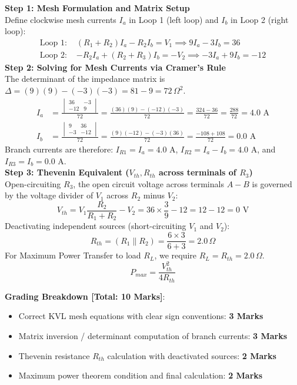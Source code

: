 \begin{solbox}
\textbf{Step 1: Mesh Formulation and Matrix Setup}\\Define clockwise mesh currents $I_a$ in Loop 1 (left loop) and $I_b$ in Loop 2 (right loop):\begin{align*}\text{Loop 1: } & (R_1 + R_2)I_a - R_2 I_b = V_1 \implies 9 I_a - 3 I_b = 36 \\\text{Loop 2: } & -R_2 I_a + (R_2 + R_3)I_b = -V_2 \implies -3 I_a + 9 I_b = -12\end{align*}\textbf{Step 2: Solving for Mesh Currents via Cramer's Rule}\\The determinant of the impedance matrix is $\Delta = (9)(9) - (-3)(-3) = 81 - 9 = 72\,\Omega^2$.\begin{align*}I_a &= \frac{\begin{vmatrix} 36 & -3 \\ -12 & 9 \end{vmatrix}}{72} = \frac{(36)(9) - (-12)(-3)}{72} = \frac{324 - 36}{72} = \frac{288}{72} = 4.0\text{ A} \\I_b &= \frac{\begin{vmatrix} 9 & 36 \\ -3 & -12 \end{vmatrix}}{72} = \frac{(9)(-12) - (-3)(36)}{72} = \frac{-108 + 108}{72} = 0.0\text{ A}\end{align*}Branch currents are therefore: $I_{R1} = I_a = 4.0\text{ A}$, $I_{R2} = I_a - I_b = 4.0\text{ A}$, and $I_{R3} = I_b = 0.0\text{ A}$.\\[2mm]\textbf{Step 3: Thevenin Equivalent ($V_{th}, R_{th}$ across terminals of $R_3$)}\\Open-circuiting $R_3$, the open circuit voltage across terminals $A-B$ is governed by the voltage divider of $V_1$ across $R_2$ minus $V_2$:\[ V_{th} = V_1 \frac{R_2}{R_1 + R_2} - V_2 = 36 \times \frac{3}{9} - 12 = 12 - 12 = 0\text{ V} \]Deactivating independent sources (short-circuiting $V_1$ and $V_2$):\[ R_{th} = (R_1 \parallel R_2) = \frac{6 \times 3}{6 + 3} = 2.0\,\Omega \]For Maximum Power Transfer to load $R_L$, we require $R_L = R_{th} = 2.0\,\Omega$.\[ P_{max} = \frac{V_{th}^2}{4 R_{th}} \]
\end{solbox}

\begin{examinertip}
\textbf{Grading Breakdown [Total: 10 Marks]}:\begin{itemize}[leftmargin=1.5em]\item Correct KVL mesh equations with clear sign conventions: \textbf{3 Marks}\item Matrix inversion / determinant computation of branch currents: \textbf{3 Marks}\item Thevenin resistance $R_{th}$ calculation with deactivated sources: \textbf{2 Marks}\item Maximum power theorem condition and final calculation: \textbf{2 Marks}\end{itemize}
\end{examinertip}
\vspace{4mm}
